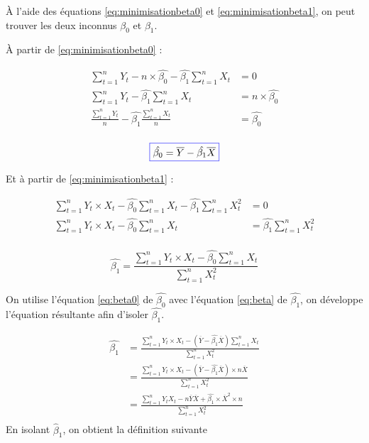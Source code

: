 \documentclass[11pt,french]{report}
\begin{document}
À l'aide des équations \ref{eq:minimisationbeta0} et \ref{eq:minimisationbeta1}, on peut trouver les deux inconnus $\beta_0$ et $\beta_1$.

\bigskip
À partir de \ref{eq:minimisationbeta0} :

\begin{align*}
\displaystyle\sum_{t=1}^n Y_t - n \times \hat{\beta_0} - \hat{\beta_1} \displaystyle\sum_{t=1}^n X_t &= 0 \\
\displaystyle\sum_{t=1}^n Y_t - \hat{\beta_1} \displaystyle\sum_{t=1}^n X_t &=  n \times \hat{\beta_0} \\
\frac{\displaystyle\sum_{t=1}^n Y_t}{n} - \hat{\beta_1} \frac{\displaystyle\sum_{t=1}^n X_t}{n} &=  \hat{\beta_0} \\
\end{align*}

\begin{equation}
\label{eq:beta0}
\color{blue}
\boxed{\color{black}
\hat{\beta_0} = \overline{Y} - \hat{\beta_1} \overline{X}
}
\end{equation}

Et à partir de \ref{eq:minimisationbeta1} :

\begin{align*}
\displaystyle\sum_{t=1}^n Y_t \times X_t - \hat{\beta_0} \displaystyle\sum_{t=1}^n X_t - \hat{\beta_1} \displaystyle\sum_{t=1}^n X_t^2 &= 0 \\
\displaystyle\sum_{t=1}^n Y_t \times X_t - \hat{\beta_0} \displaystyle\sum_{t=1}^n X_t &=  \hat{\beta_1} \displaystyle\sum_{t=1}^n X_t^2 \\
\end{align*}

\begin{equation}
\label{eq:beta}
\hat{\beta_1} =  \frac{\displaystyle\sum_{t=1}^n Y_t \times X_t - \hat{\beta_0} \displaystyle\sum_{t=1}^n X_t}{\displaystyle\sum_{t=1}^n X_t^2}
\end{equation}

On utilise l'équation \ref{eq:beta0} de $\hat{\beta_0}$ avec l'équation \ref{eq:beta} de $\hat{\beta_1}$, on développe l'équation résultante afin d'isoler $\hat{\beta_1}$.

\begin{align*}
\hat{\beta_1} &= \frac{\displaystyle\sum_{t=1}^n Y_t \times X_t - (\overline{Y} - \hat{\beta_1}\overline{X})\displaystyle\sum_{t=1}^n X_t}{\displaystyle\sum_{t=1}^n X_t^2} \\
&= \frac{\displaystyle\sum_{t=1}^n Y_t \times X_t - (\overline{Y} - \hat{\beta_1}\overline{X})\times n \overline{X}}{\displaystyle\sum_{t=1}^n X_t^2} \\
&= \frac{\displaystyle\sum_{t=1}^n Y_t X_t - n\overline{Y}\overline{X} + \hat{\beta_1}\times \overline{X}^2 \times n}{\displaystyle\sum_{t=1}^n X_t^2} \\
\end{align*}
En isolant $\hat{\beta}_1$, on obtient la définition suivante
\end{document}

